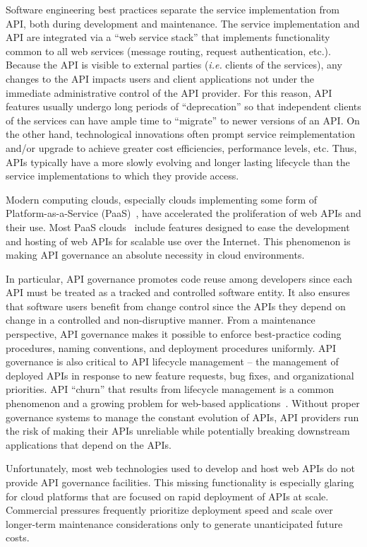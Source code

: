 Software engineering best practices separate the service implementation
from API, both during development and maintenance.
The service implementation and API are integrated via 
a ``web service stack'' that implements functionality common to all web
services (message routing, request authentication, etc.).
Because the API is visible to external parties ({\em i.e.} clients of the
services), any changes to the API
impacts users and client applications not under the immediate administrative control
of the API provider.  For this reason, API features 
usually undergo long
periods of ``deprecation'' so that independent clients of the services can have
ample time to ``migrate'' to newer versions of an API.  On the other hand,
technological innovations often prompt service reimplementation and/or 
upgrade to
achieve greater cost efficiencies, performance levels, etc.
Thus, APIs typically have a more
slowly evolving and longer lasting lifecycle than the service
implementations to which they provide access. 

Modern computing clouds, especially clouds implementing some form
of Platform-as-a-Service (PaaS)~\cite{4548165}, have accelerated the
proliferation of web APIs and their use.  Most PaaS
clouds~\cite{appscale13,cloudfoundry,openshift} include
features designed to
ease the development and hosting of web APIs for scalable use over the Internet. 
This phenomenon is making API governance an absolute necessity in cloud
environments.

In particular, API governance promotes code reuse among developers
since each API must be treated as a tracked and controlled software entity.
It also ensures that software users benefit from change control since the APIs
they depend on
change in a controlled and non-disruptive manner.  From a maintenance
perspective, API governance 
makes it possible to enforce best-practice coding procedures, 
naming conventions, and deployment procedures uniformly.
API governance is also critical to API lifecycle
management --  the management of deployed APIs in response to new feature
requests, bug fixes, and organizational priorities. 
API ``churn'' that results from lifecycle management
is a common phenomenon and a growing
problem for web-based applications~\cite{6930607}.
Without proper governance systems to manage the constant evolution of APIs,
API providers run the risk of making their APIs unreliable while potentially
breaking downstream applications that depend on the APIs.

Unfortunately, most web technologies used to develop and host web APIs do not 
provide API governance facilities. This missing functionality is
especially glaring
for cloud platforms that are focused on rapid
deployment of APIs at scale.   Commercial pressures frequently prioritize
deployment speed and scale over longer-term maintenance considerations only to
generate unanticipated future costs.


